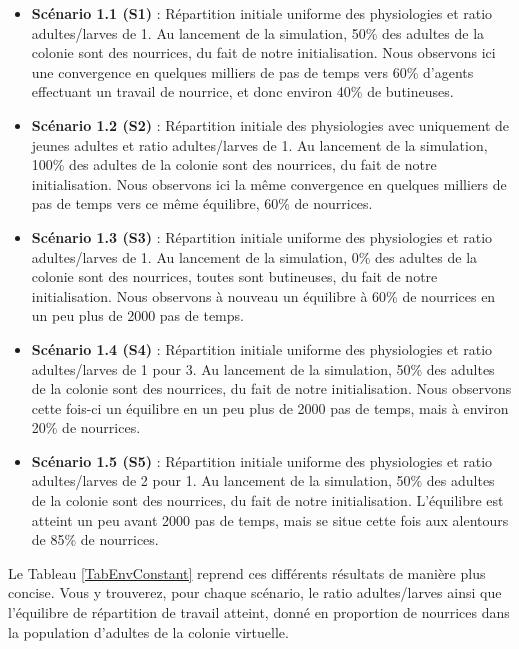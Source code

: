 	\begin{itemize}
		\item \textbf{Scénario 1.1 (S1)} : Répartition initiale uniforme des physiologies et ratio adultes/larves de 1. Au lancement de la simulation, 50\% des adultes de la colonie sont des nourrices, du fait de notre initialisation. Nous observons ici une convergence en quelques milliers de pas de temps vers 60\% d'agents effectuant un travail de nourrice, et donc environ 40\% de butineuses.
		
		\item \textbf{Scénario 1.2 (S2)} : Répartition initiale des physiologies avec uniquement de jeunes adultes et ratio adultes/larves de 1. Au lancement de la simulation, 100\% des adultes de la colonie sont des nourrices, du fait de notre initialisation. Nous observons ici la même convergence en quelques milliers de pas de temps vers ce même équilibre, 60\% de nourrices.
		
		\item \textbf{Scénario 1.3 (S3)} : Répartition initiale uniforme des physiologies et ratio adultes/larves de 1. Au lancement de la simulation, 0\% des adultes de la colonie sont des nourrices, toutes sont butineuses, du fait de notre initialisation. Nous observons à nouveau un équilibre à 60\% de nourrices en un peu plus de 2000 pas de temps.
		
		\item \textbf{Scénario 1.4 (S4)} : Répartition initiale uniforme des physiologies et ratio adultes/larves de 1 pour 3. Au lancement de la simulation, 50\% des adultes de la colonie sont des nourrices, du fait de notre initialisation. Nous observons cette fois-ci un équilibre en un peu plus de 2000 pas de temps, mais à environ 20\% de nourrices.
		
		\item \textbf{Scénario 1.5 (S5)} : Répartition initiale uniforme des physiologies et ratio adultes/larves de 2 pour 1. Au lancement de la simulation, 50\% des adultes de la colonie sont des nourrices, du fait de notre initialisation. L'équilibre est atteint un peu avant 2000 pas de temps, mais se situe cette fois aux alentours de 85\% de nourrices.		
	\end{itemize}
	
	Le Tableau \ref{TabEnvConstant} reprend ces différents résultats de manière plus concise. Vous y trouverez, pour chaque scénario, le ratio adultes/larves ainsi que l'équilibre de répartition de travail atteint, donné en proportion de nourrices dans la population d'adultes de la colonie virtuelle.
	
